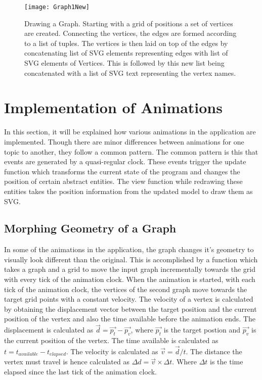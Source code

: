 \begin{figure}[!ht]
\centering
\texttt{[image: Graph1New]}
\caption{
         Drawing a Graph. Starting with a grid of positions
         a set of vertices are created. Connecting the vertices,
         the edges are formed according to a list of tuples. The 
         vertices is then laid on top of the edges by concatenating list
         of SVG elements representing edges with list of SVG elements
         of Vertices. This is followed by this new list being concatenated
         with a list of SVG text representing the vertex names.
        }
\end{figure}

\section{Implementation of Animations}
In this section, it will be explained how various animations in the
application are implemented. Though there are minor differences between animations
for one topic to another, they follow a common pattern. The common pattern is
this that events are generated by a quasi-regular clock. These events trigger
the update function which transforms the current state of the program and
changes the position of certain abstract entities. The view function while
redrawing these entities takes the position information from the updated model
to draw them as SVG.

\subsection{Morphing Geometry of a Graph}
\label{animation: morphing}
In some of the animations in the application, the graph changes it's geometry
to visually look different than the original. This is accomplished by a
function which takes a graph and a grid to move the input graph incrementally
towards the grid with every tick of the animation clock.  When the animation is
started, with each tick of the animation clock, the vertices of the second
graph move towards the target grid points with a constant velocity.  The
velocity of a vertex is calculated by obtaining the displacement vector between
the target position and the current position of the vertex and also the time
available before the animation ends.  The displacement is calculated as
$\vec{d} = \vec{p_t} - \vec{p_v}$, where $\vec{p_t}$ is the target postion and
$\vec{p_v}$ is the current position of the vertex. The time available is
calculated as $t = t_{available} - t_{elapsed}$. The velocity is calculated as
$\vec{v} = \vec{d}/t$.  The distance the vertex must travel is hence calculated
as $\Delta d = \vec{v} \times \Delta t$.  Where $\Delta t$ is the time elapsed
since the last tick of the animation clock.


